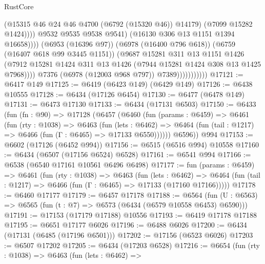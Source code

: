 \begin{lexlean}{RustCore}
\begin{coremodule}
                                          (@15315 @46 @24 @46 @4700 (@6792 (@15320 @46)) @14179)
                                          (@7099 @15282 @1424))))
                                    @9532
                                    @9535
                                    @9538
                                    @9541)
                                  (@16130 @306 @13 @1151 @1394 @16658))))
                            (@6953 (@16396 @97))
                            (@6978 (@16400 @796 @618))
                            (@6759 (@16407 @618 @99 @3445 @1151))
                            (@9687
                              @15281
                              @311
                              @13
                              @1151
                              @1426
                              (@7912
                                @15281
                                @1424
                                @311
                                @13
                                @1426
                                (@7944 @15281 @1424 @308 @13 @1425 @7968))))
                          @7376
                          (@6978 (@12003 @968 @797))
                          @7389)))))))))))
@17121 := @6417 @149
@17125 := @6419 (@6423 @149) (@6429 @149)
@17126 := @6438 @10555
@17128 := @6434 (@17126 @6454)
@17130 := @6477 (@6478 @149)
@17131 := @6473 @17130
@17133 := @6434 (@17131 @6503)
@17150 := @6433
    (fun (fn : @90) =>
    @17128
      (@6457
        (@6460
          (fun (params : @6459) =>
          @6461
            (fun (rty : @1038) =>
            @6463
              (fun (lets : @6462) =>
              @6464 (fun (tail : @1217) => @6466 (fun (Γ : @6465) => @17133 @6550))))))
        @6596))
    @994
@17153 := @6602 (@17126 (@6452 @994))
@17156 := @6515 (@6516 @994) @10558
@17160 := @6434 (@6507 (@17156 @6524) @6528)
@17161 := @6541 @994
@17166 := @6538 (@6540 @17161 @10561 @6496 @6498)
@17177 := fun (params : @6459) =>
  @6461
    (fun (rty : @1038) =>
    @6463
      (fun (lets : @6462) =>
      @6464 (fun (tail : @1217) => @6466 (fun (Γ : @6465) => @17133 (@17160 @17166)))))
@17178 := @6460 @17177
@17179 := @6457 @17178
@17188 := @6564
    (fun (U : @6563) => @6565 (fun (t : @7) => @6573 (@6434 (@6579 @10558 @6453) @6590)))
@17191 := @17153 (@17179 @17188) @10556
@17193 := @6419 @17178 @17188
@17195 := @6651 @17177 @6026
@17196 := @6488 @6026
@17200 := @6434 (@17131 (@6485 (@17196 @6501)))
@17202 := @17156 (@6523 @6026)
@17203 := @6507 @17202
@17205 := @6434 (@17203 @6528)
@17216 := @6654
    (fun (rty : @1038) =>
    @6463
      (fun (lets : @6462) =>

\end{coremodule}
\end{lexlean}
